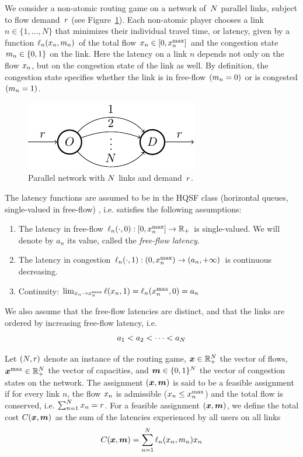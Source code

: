 We consider a non-atomic routing game on a network of~$N$ parallel links, subject to flow demand~$r$ (see Figure~\ref{fig:network}). Each non-atomic player chooses a link ${n \in \{1, \dots, N\} }$ that minimizes their individual travel time, or latency, given by a function $\ell_n(x_n, m_n)$ of the total flow $x_n \in [0, x^{\max}_n]$ and the congestion state $m_n \in \{0,1\}$ on the link. Here the latency on a link $n$ depends not only on the flow $x_n$, but on the congestion state of the link as well. By definition, the congestion state specifies whether the link is in free-flow $(m_n = 0)$ or is congested $(m_n = 1)$.
%
\begin{figure}[h]
\centering
\includegraphics{TikZ/parallel_network.pdf}
\caption{Parallel network with $N$ links and demand~$r$.}
\label{fig:network}
\end{figure}
%
The latency functions are assumed to be in the HQSF class (horizontal queues, single-valued in free-flow) \cite{krichene12}, i.e. satisfies the following assumptions:
\begin{enumerate}
\item The latency in free-flow ${ \ell_n(\cdot, 0): [0, x^{\max}_n] \rightarrow \mathbb{R}_+ }$ is single-valued. We will denote by $a_n$ its value, called the \emph{free-flow latency}.
\item The latency in congestion $ \ell_n(\cdot, 1) : (0, x^{\max}_n) \rightarrow (a_n, +\infty) $ is continuous decreasing.
\item Continuity: ${\lim_{x_n \rightarrow x^{\max}_n} \ell(x_n, 1) = \ell_n(x^{\max}_n, 0) = a_n}$
\end{enumerate}
We also assume that the free-flow latencies are distinct, and that the links are ordered by increasing free-flow latency, i.e.
\begin{equation}
\label{eq:index}
a_1 < a_2 < \dots < a_N
\end{equation}

Let $(N, r)$ denote an instance of the routing game, $\boldsymbol {x} \in \mathbb{R}_+^N$ the vector of flows, $\boldsymbol {x}^{\max} \in \mathbb{R}_+^N$ the vector of capacities, and $\boldsymbol {m} \in \{0,1\}^N$ the vector of congestion states on the network. The assignment $(\boldsymbol {x}, \boldsymbol {m})$ is said to be a feasible assignment if for every link $n$, the flow $x_n$ is admissible ($x_n \leq x^{\max}_n$) and the total flow is conserved, i.e. $\sum_{n=1}^{N} x_n = r$. For a feasible assignment $(\boldsymbol {x}, \boldsymbol {m})$, we define the total cost $C(\boldsymbol {x}, \boldsymbol {m})$ as the sum of the latencies experienced by all users on all links
\[
C(\boldsymbol {x}, \boldsymbol {m}) = \sum_{n=1}^N {\ell_n(x_n, m_n) x_n}
\]

